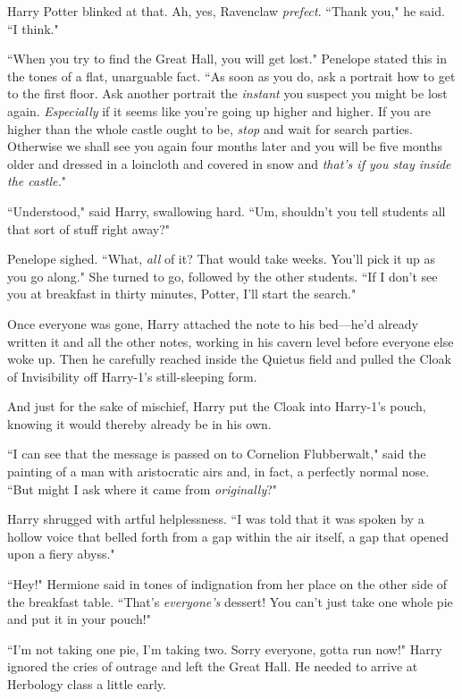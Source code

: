 Harry Potter blinked at that. Ah, yes, Ravenclaw \emph{prefect}. ``Thank you," he said. ``I think."

``When you try to find the Great Hall, you will get lost." Penelope stated this in the tones of a flat, unarguable fact. ``As soon as you do, ask a portrait how to get to the first floor. Ask another portrait the \emph{instant} you suspect you might be lost again. \emph{Especially} if it seems like you're going up higher and higher. If you are higher than the whole castle ought to be, \emph{stop} and wait for search parties. Otherwise we shall see you again four months later and you will be five months older and dressed in a loincloth and covered in snow and \emph{that's if you stay inside the castle.}"

``Understood," said Harry, swallowing hard. ``Um, shouldn't you tell students all that sort of stuff right away?"

Penelope sighed. ``What, \emph{all} of it? That would take weeks. You'll pick it up as you go along." She turned to go, followed by the other students. ``If I don't see you at breakfast in thirty minutes, Potter, I'll start the search."

Once everyone was gone, Harry attached the note to his bed—he'd already written it and all the other notes, working in his cavern level before everyone else woke up. Then he carefully reached inside the Quietus field and pulled the Cloak of Invisibility off Harry-1's still-sleeping form.

And just for the sake of mischief, Harry put the Cloak into Harry-1's pouch, knowing it would thereby already be in his own.

\later

``I can see that the message is passed on to Cornelion Flubberwalt," said the painting of a man with aristocratic airs and, in fact, a perfectly normal nose. ``But might I ask where it came from \emph{originally}?"

Harry shrugged with artful helplessness. ``I was told that it was spoken by a hollow voice that belled forth from a gap within the air itself, a gap that opened upon a fiery abyss."

\later

``Hey!" Hermione said in tones of indignation from her place on the other side of the breakfast table. ``That's \emph{everyone's} dessert! You can't just take one whole pie and put it in your pouch!"

``I'm not taking one pie, I'm taking two. Sorry everyone, gotta run now!" Harry ignored the cries of outrage and left the Great Hall. He needed to arrive at Herbology class a little early.

